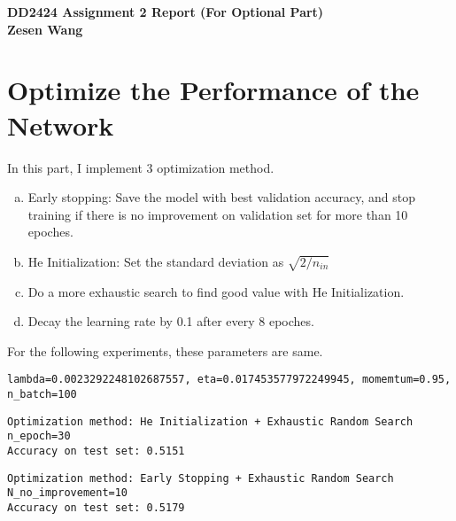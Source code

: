 

\usepackage{tikz}
\usepackage{graphicx}
\usepackage{amssymb}
\usepackage{amsmath}
\usepackage{harpoon}
\usepackage{float}
\usepackage{enumerate}
\usepackage{algorithm}
\usepackage{algpseudocode}
\usepackage{subcaption}
\usepackage{bm}
\usepackage{listings}


\usetikzlibrary{fit,positioning}


\begin{flushleft}

\bf{DD2424 Assignment 2 Report (For Optional Part)} \\
\bf{Zesen Wang} \\


\end{flushleft}

\section{Optimize the Performance of the Network}

In this part, I implement 3 optimization method.

\begin{enumerate}[(a)]
	\item Early stopping: Save the model with best validation accuracy, and stop training if there is no improvement on validation set for more than 10 epoches.
	\item He Initialization: Set the standard deviation as $\sqrt{2/n_{in}}$
	\item Do a more exhaustic search to find good value with He Initialization.
	\item Decay the learning rate by 0.1 after every 8 epoches.
\end{enumerate}

For the following experiments, these parameters are same.
\begin{verbatim}
lambda=0.0023292248102687557, eta=0.017453577972249945, momemtum=0.95, n_batch=100
\end{verbatim}

\begin{verbatim}
Optimization method: He Initialization + Exhaustic Random Search
n_epoch=30
Accuracy on test set: 0.5151
\end{verbatim}

\begin{verbatim}
Optimization method: Early Stopping + Exhaustic Random Search
N_no_improvement=10
Accuracy on test set: 0.5179
\end{verbatim}

